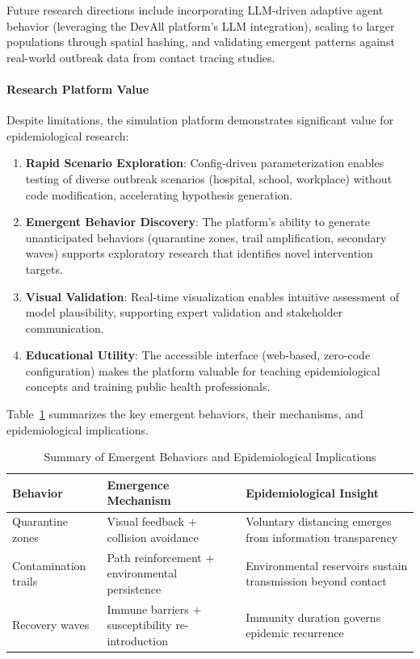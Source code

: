Future research directions include incorporating LLM-driven adaptive agent behavior (leveraging the DevAll platform's LLM integration), scaling to larger populations through spatial hashing, and validating emergent patterns against real-world outbreak data from contact tracing studies.

\paragraph{Research Platform Value}

Despite limitations, the simulation platform demonstrates significant value for epidemiological research:

\begin{enumerate}
    \item \textbf{Rapid Scenario Exploration}: Config-driven parameterization enables testing of diverse outbreak scenarios (hospital, school, workplace) without code modification, accelerating hypothesis generation.
    
    \item \textbf{Emergent Behavior Discovery}: The platform's ability to generate unanticipated behaviors (quarantine zones, trail amplification, secondary waves) supports exploratory research that identifies novel intervention targets.
    
    \item \textbf{Visual Validation}: Real-time visualization enables intuitive assessment of model plausibility, supporting expert validation and stakeholder communication.
    
    \item \textbf{Educational Utility}: The accessible interface (web-based, zero-code configuration) makes the platform valuable for teaching epidemiological concepts and training public health professionals.
\end{enumerate}

Table~\ref{tab:emergent-summary} summarizes the key emergent behaviors, their mechanisms, and epidemiological implications.

\begin{table}[t]
\centering
\caption{Summary of Emergent Behaviors and Epidemiological Implications}
\label{tab:emergent-summary}
\begin{tabular}{@{}p{1.8cm}p{2.3cm}p{2.5cm}@{}}
\toprule
\textbf{Behavior} & \textbf{Emergence Mechanism} & \textbf{Epidemiological Insight} \\
\midrule
Quarantine zones & Visual feedback + collision avoidance & Voluntary distancing emerges from information transparency \\
\addlinespace
Contamination trails & Path reinforcement + environmental persistence & Environmental reservoirs sustain transmission beyond contact \\
\addlinespace
Recovery waves & Immune barriers + susceptibility re-introduction & Immunity duration governs epidemic recurrence \\
\bottomrule
\end{tabular}
\end{table}
